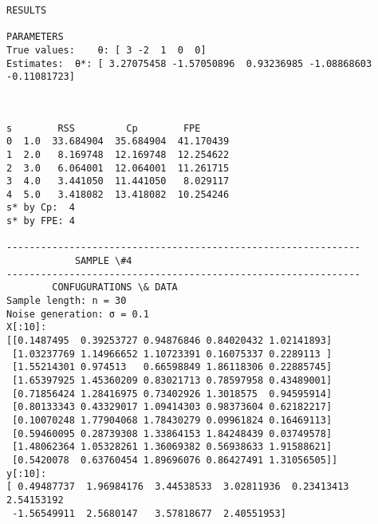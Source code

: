 \documentclass[11pt]{article}
\begin{document}
\begin{Verbatim}[commandchars=\\\{\}]
			RESULTS

PARAMETERS
True values:	θ: [ 3 -2  1  0  0]
Estimates:	θ*: [ 3.27075458 -1.57050896  0.93236985 -1.08868603 -0.11081723]

    \end{Verbatim}

    \begin{center}
    \end{center}
    { \hspace*{\fill} \\}
    
    \begin{Verbatim}[commandchars=\\\{\}]
     s        RSS         Cp        FPE
0  1.0  33.684904  35.684904  41.170439
1  2.0   8.169748  12.169748  12.254622
2  3.0   6.064001  12.064001  11.261715
3  4.0   3.441050  11.441050   8.029117
4  5.0   3.418082  13.418082  10.254246
s* by Cp:  4
s* by FPE: 4

--------------------------------------------------------------
			SAMPLE \#4
--------------------------------------------------------------
		CONFUGURATIONS \& DATA
Sample length: n = 30
Noise generation: σ = 0.1
X[:10]:
[[0.1487495  0.39253727 0.94876846 0.84020432 1.02141893]
 [1.03237769 1.14966652 1.10723391 0.16075337 0.2289113 ]
 [1.55214301 0.974513   0.66598849 1.86118306 0.22885745]
 [1.65397925 1.45360209 0.83021713 0.78597958 0.43489001]
 [0.71856424 1.28416975 0.73402926 1.3018575  0.94595914]
 [0.80133343 0.43329017 1.09414303 0.98373604 0.62182217]
 [0.10070248 1.77904068 1.78430279 0.09961824 0.16469113]
 [0.59460095 0.28739308 1.33864153 1.84248439 0.03749578]
 [1.48062364 1.05328261 1.36069382 0.56938633 1.91588621]
 [0.5420078  0.63760454 1.89696076 0.86427491 1.31056505]]
y[:10]:
[ 0.49487737  1.96984176  3.44538533  3.02811936  0.23413413  2.54153192
 -1.56549911  2.5680147   3.57818677  2.40551953]


\end{Verbatim}
\end{document}
